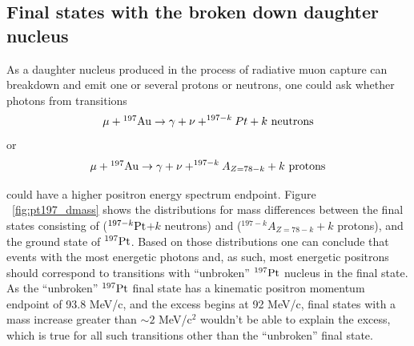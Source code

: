 \documentclass[12pt]{article}
\newcommand {\Au}[1]     {\mbox{$\rm ^{#1}Au$}}                 %
\begin{document}
\subsection{Final states with the broken down daughter nucleus}

As a daughter nucleus produced in the process of radiative muon capture can
breakdown and emit one or several protons or neutrons, one could ask whether
photons from transitions
$$
\mu + \Au{197} \rightarrow \gamma + \nu + ^{197-k}Pt + k \rm ~neutrons
$$
or 
$$
\mu + \Au{197} \rightarrow \gamma + \nu + ^{197-k}A_{Z=78-k} + k \rm ~protons
$$

could have a higher positron energy spectrum endpoint.
Figure ~\ref{fig:pt197_dmass} shows the distributions for mass differences
between the final states consisting of ($^{197-k} \rm Pt$$ + k$ neutrons) and 
($^{197-k}A_{Z=78-k} + k$ protons),
and the ground state of $^{197} \rm Pt$. Based on those distributions one can conclude
that events with the most energetic photons and, as such, most energetic 
positrons should correspond to transitions with ``unbroken'' $^{197} \rm Pt$ nucleus
in the final state. As the ``unbroken'' $^{197} \rm Pt$ final state has a kinematic positron
momentum endpoint of 93.8 MeV/c, and the excess begins at 92 MeV/c, final states
with a mass increase greater than $\sim 2$ MeV/c$^2$ wouldn't be able to explain the excess,
which is true for all such transitions other than the ``unbroken'' final state.
\end{document}
